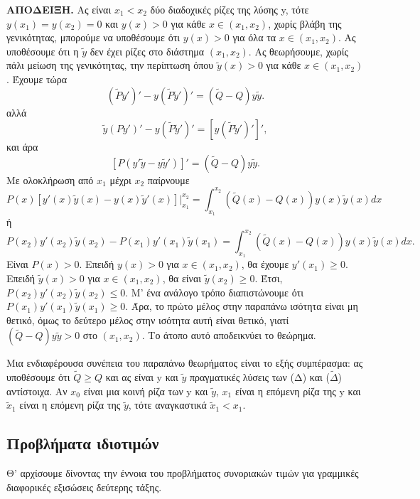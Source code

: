 \documentclass[11pt,a4paper,twoside]{book}
\begin{document}
\noindent\textbf{ΑΠΟΔΕΙΞΗ.} Ας είναι $x_1 < x_2$ δύο διαδοχικές ρίζες της λύσης y, τότε $y(x_1)=y(x_2)=0$ και $y(x)>0$ για κάθε $x \in (x_1,x_2)$, χωρίς βλάβη της γενικότητας, μπορούμε να υποθέσουμε ότι $y(x)>0$ για όλα τα $x \in (x_1,x_2)$. Ας υποθέσουμε ότι η $\tilde{y}$ δεν έχει ρίζες στο διάστημα $(x_1,x_2)$. Ας θεωρήσουμε, χωρίς πάλι μείωση της γενικότητας, την περίπτωση όπου $\tilde{y}(x)>0$ για κάθε $x \in (x_1,x_2)$. Έχουμε τώρα
\[ (\tilde{P}y')' - y(\tilde{P}\tilde{y}')' = (\tilde{Q}-Q)y\tilde{y}. \]
αλλά
\[ \tilde{y}(Py')' - y(\tilde{P}\tilde{y}')' = [y(\tilde{P}\tilde{y}')']', \]
και άρα
\[ [P(y'\tilde{y}-y\tilde{y}')]' = (\tilde{Q}-Q)y\tilde{y}. \]
Με ολοκλήρωση από $x_1$ μέχρι $x_2$ παίρνουμε
\[ P(x)[y'(x)\tilde{y}(x)-y(x)\tilde{y}'(x)]\bigg|_{x_1}^{x_2} = \int_{x_1}^{x_2} (\tilde{Q}(x)-Q(x))y(x)\tilde{y}(x)dx \]
ή
\[ P(x_2)y'(x_2)\tilde{y}(x_2) - P(x_1)y'(x_1)\tilde{y}(x_1) = \int_{x_1}^{x_2} (\tilde{Q}(x)-Q(x))y(x)\tilde{y}(x)dx. \]
Είναι $P(x)>0$. Επειδή $y(x)>0$ για $x \in (x_1,x_2)$, θα έχουμε $y'(x_1) \geq 0$. Επειδή $\tilde{y}(x)>0$ για $x \in (x_1,x_2)$, θα είναι $\tilde{y}(x_2)\geq 0$. Έτσι, $P(x_2)y'(x_2)\tilde{y}(x_2)\leq 0$. Μ' ένα ανάλογο τρόπο διαπιστώνουμε ότι $P(x_1)y'(x_1)\tilde{y}(x_1)\geq 0$. Άρα, το πρώτο μέλος στην παραπάνω ισότητα είναι μη θετικό, όμως το δεύτερο μέλος στην ισότητα αυτή είναι θετικό, γιατί $(\tilde{Q}-Q)y\tilde{y}>0$ στο $(x_1,x_2)$. Το άτοπο αυτό αποδεικνύει το θεώρημα.

Μια ενδιαφέρουσα συνέπεια του παραπάνω θεωρήματος είναι το εξής συμπέρασμα: ας υποθέσουμε ότι $\tilde{Q} \geq Q$ και ας είναι y και $\tilde{y}$ πραγματικές λύσεις των (Δ) και ($\tilde{\Delta}$) αντίστοιχα. Αν $x_0$ είναι μια κοινή ρίζα των y και $\tilde{y}$, $x_1$ είναι η επόμενη ρίζα της y και $\tilde{x}_1$ είναι η επόμενη ρίζα της $\tilde{y}$, τότε αναγκαστικά $\tilde{x}_1 < x_1$.

\subsection{Προβλήματα ιδιοτιμών}

Θ' αρχίσουμε δίνοντας την έννοια του προβλήματος συνοριακών τιμών για γραμμικές διαφορικές εξισώσεις δεύτερης τάξης.
\end{document}
